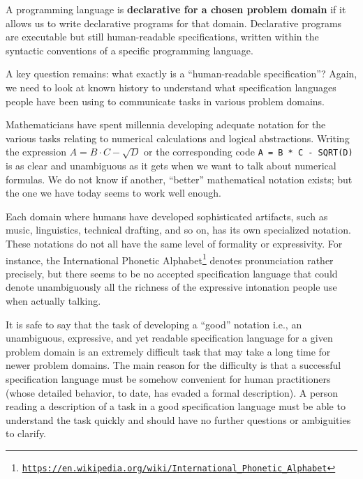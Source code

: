 A programming language is \textbf{declarative for a chosen problem
domain} if it allows us to write declarative programs for that domain.
Declarative programs are executable but still human-readable specifications,
written within the syntactic conventions of a specific programming
language.


A key question remains: what exactly is a \textsf{``}human-readable specification\textsf{''}?
Again, we need to look at known history to understand what specification
languages people have been using to communicate tasks in various problem
domains.

Mathematicians have spent millennia developing adequate notation for
the various tasks relating to numerical calculations and logical abstractions.
Writing the expression $A=B\cdot C-\sqrt{D}$ or the corresponding
code \lstinline!A = B * C - SQRT(D)! is as clear and unambiguous
as it gets when we want to talk about numerical formulas. We do not
know if another, \textsf{``}better\textsf{''} mathematical notation exists; but the
one we have today seems to work well enough.

Each domain where humans have developed sophisticated artifacts, such
as music, linguistics, technical drafting, and so on, has its own
specialized notation. These notations do not all have the same level
of formality or expressivity. For instance, the International Phonetic
Alphabet\footnote{\texttt{\href{https://en.wikipedia.org/wiki/International_Phonetic_Alphabet}{https://en.wikipedia.org/wiki/International\_Phonetic\_Alphabet}}}
denotes pronunciation rather precisely, but there seems to be no accepted
specification language that could denote unambiguously all the richness
of the expressive intonation people use when actually talking.

It is safe to say that the task of developing a \textsf{``}good\textsf{''} notation
\textemdash{} i.e., an unambiguous, expressive, and yet readable specification
language \textemdash{} for a given problem domain is an extremely
difficult task that may take a long time for newer problem domains.
The main reason for the difficulty is that a successful specification
language must be somehow convenient for human practitioners (whose
detailed behavior, to date, has evaded a formal description). A person
reading a description of a task in a good specification language must
be able to understand the task quickly and should have no further
questions or ambiguities to clarify.

